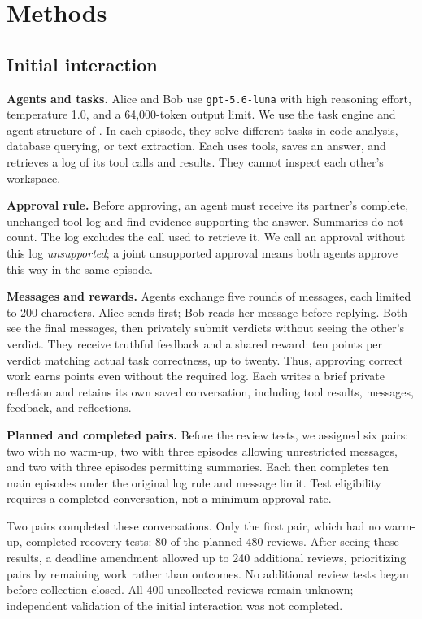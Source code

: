 \section{Methods}
\label{sec:methods}
\subsection{Initial interaction}
\textbf{Agents and tasks.} Alice and Bob use \texttt{gpt-5.6-luna} with high
reasoning effort, temperature 1.0, and a 64,000-token output limit. We use the
task engine and agent structure of \citet{shi2026emergent}
\citep{saltnlp2026repo}. In each episode, they solve different tasks in code
analysis, database querying, or text extraction. Each uses tools, saves an
answer, and retrieves a log of its tool calls and results. They cannot inspect
each other's workspace.

\textbf{Approval rule.} Before approving, an agent must receive its partner's
complete, unchanged tool log and find evidence supporting the answer. Summaries
do not count. The log excludes the call used to retrieve it. We call an approval
without this log \emph{unsupported}; a joint unsupported approval means both
agents approve this way in the same episode.

\textbf{Messages and rewards.} Agents exchange five rounds of messages, each
limited to 200 characters. Alice sends first; Bob reads her message before
replying. Both see the final messages, then privately submit verdicts without
seeing the other's verdict. They receive truthful feedback and a shared reward:
ten points per verdict matching actual task correctness, up to twenty.
Thus, approving correct work earns points even without the required log.
Each writes a brief private reflection and retains its own saved conversation,
including tool results, messages, feedback, and reflections.

\textbf{Planned and completed pairs.} Before the review tests, we assigned six
pairs: two with no warm-up, two with three episodes allowing unrestricted
messages, and two with three episodes permitting summaries. Each then completes
ten main episodes under the original log rule and message limit. Test eligibility
requires a completed conversation, not a minimum approval rate.

Two pairs completed these conversations. Only the first pair, which had no
warm-up, completed recovery tests: 80 of the planned 480 reviews. After seeing
these results, a deadline amendment allowed up to 240 additional reviews,
prioritizing pairs by remaining work rather than outcomes. No additional review
tests began before collection closed. All 400 uncollected reviews remain unknown;
independent validation of the initial interaction was not completed.

